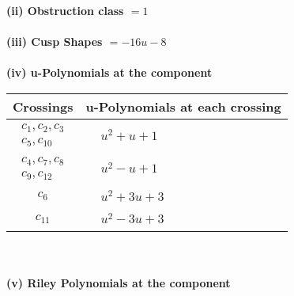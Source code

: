 \documentclass[1p]{elsarticle_modified}
\theoremstyle{definition}
\begin{document}
\flushleft \textbf{(ii) Obstruction class $= 1$}\\~\\
\flushleft \textbf{(iii) Cusp Shapes $= -16 u-8$}\\~\\
\newpage\renewcommand{\arraystretch}{1}
\flushleft \textbf{(iv) u-Polynomials at the component}\newline \\
\begin{tabular}{m{50pt}|m{274pt}}
Crossings & \hspace{64pt}u-Polynomials at each crossing \\
\hline $$\begin{aligned}c_{1},c_{2},c_{3}\\c_{5},c_{10}\end{aligned}$$&$\begin{aligned}
&u^2+u+1
\end{aligned}$\\
\hline $$\begin{aligned}c_{4},c_{7},c_{8}\\c_{9},c_{12}\end{aligned}$$&$\begin{aligned}
&u^2- u+1
\end{aligned}$\\
\hline $$\begin{aligned}c_{6}\end{aligned}$$&$\begin{aligned}
&u^2+3 u+3
\end{aligned}$\\
\hline $$\begin{aligned}c_{11}\end{aligned}$$&$\begin{aligned}
&u^2-3 u+3
\end{aligned}$\\
\hline
\end{tabular}\\~\\
\newpage\renewcommand{\arraystretch}{1}
\flushleft \textbf{(v) Riley Polynomials at the component}\newline \\
\end{document}
